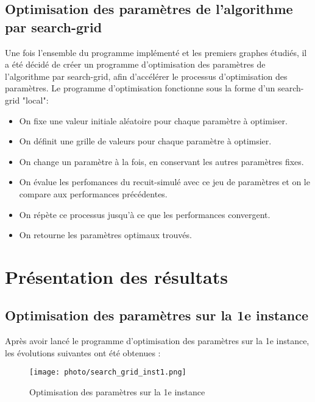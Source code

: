 \documentclass[a4paper, 12pt]{article}
\begin{document}
\subsection{Optimisation des paramètres de l'algorithme par search-grid}
Une fois l'ensemble du programme implémenté et les premiers graphes étudiés, il a été décidé de créer un programme d'optimisation des paramètres de l'algorithme par search-grid, afin d'accélérer le processus d'optimisation des paramètres.
Le programme d'optimisation fonctionne sous la forme d'un search-grid "local":
\begin{itemize}
    \item On fixe une valeur initiale aléatoire pour chaque paramètre à optimiser.
    \item On définit une grille de valeurs pour chaque paramètre à optimsier.
    \item On change un paramètre à la fois, en conservant les autres paramètres fixes.
    \item On évalue les perfomances du recuit-simulé avec ce jeu de paramètres et on le compare aux performances précédentes.
    \item On répète ce processus jusqu'à ce que les performances convergent.
    \item On retourne les paramètres optimaux trouvés.
\end{itemize}



\section{Présentation des résultats}
\subsection{Optimisation des paramètres sur la 1e instance}
Après avoir lancé le programme d'optimisation des paramètres sur la 1e instance, les évolutions suivantes ont été obtenues :
\begin{figure}[!h]
    \centering
    \texttt{[image: photo/search\_grid\_inst1.png]}
    \caption{Optimisation des paramètres sur la 1e instance}
    \label{fig:parametres_1}
\end{figure}
\end{document}
